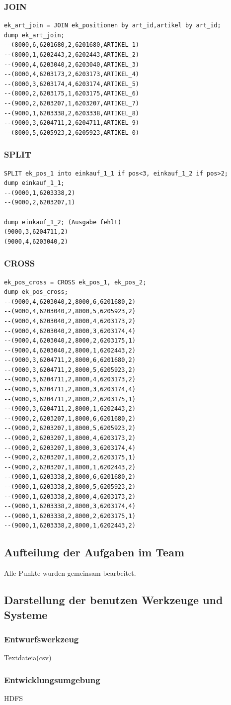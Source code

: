 \begin{itemize}
\subsubsection*{JOIN}
\begin{lstlisting}
ek_art_join = JOIN ek_positionen by art_id,artikel by art_id;
dump ek_art_join;
--(8000,6,6201680,2,6201680,ARTIKEL_1)
--(8000,1,6202443,2,6202443,ARTIKEL_2)
--(9000,4,6203040,2,6203040,ARTIKEL_3)
--(8000,4,6203173,2,6203173,ARTIKEL_4)
--(8000,3,6203174,4,6203174,ARTIKEL_5)
--(8000,2,6203175,1,6203175,ARTIKEL_6)
--(9000,2,6203207,1,6203207,ARTIKEL_7)
--(9000,1,6203338,2,6203338,ARTIKEL_8)
--(9000,3,6204711,2,6204711,ARTIKEL_9)
--(8000,5,6205923,2,6205923,ARTIKEL_0)
\end{lstlisting}

\subsubsection*{SPLIT}
\begin{lstlisting}
SPLIT ek_pos_1 into einkauf_1_1 if pos<3, einkauf_1_2 if pos>2;
dump einkauf_1_1;
--(9000,1,6203338,2)
--(9000,2,6203207,1)

dump einkauf_1_2; (Ausgabe fehlt)
(9000,3,6204711,2)
(9000,4,6203040,2)
\end{lstlisting}

\subsubsection*{CROSS}
\begin{lstlisting}
ek_pos_cross = CROSS ek_pos_1, ek_pos_2;
dump ek_pos_cross;
--(9000,4,6203040,2,8000,6,6201680,2)
--(9000,4,6203040,2,8000,5,6205923,2)
--(9000,4,6203040,2,8000,4,6203173,2)
--(9000,4,6203040,2,8000,3,6203174,4)
--(9000,4,6203040,2,8000,2,6203175,1)
--(9000,4,6203040,2,8000,1,6202443,2)
--(9000,3,6204711,2,8000,6,6201680,2)
--(9000,3,6204711,2,8000,5,6205923,2)
--(9000,3,6204711,2,8000,4,6203173,2)
--(9000,3,6204711,2,8000,3,6203174,4)
--(9000,3,6204711,2,8000,2,6203175,1)
--(9000,3,6204711,2,8000,1,6202443,2)
--(9000,2,6203207,1,8000,6,6201680,2)
--(9000,2,6203207,1,8000,5,6205923,2)
--(9000,2,6203207,1,8000,4,6203173,2)
--(9000,2,6203207,1,8000,3,6203174,4)
--(9000,2,6203207,1,8000,2,6203175,1)
--(9000,2,6203207,1,8000,1,6202443,2)
--(9000,1,6203338,2,8000,6,6201680,2)
--(9000,1,6203338,2,8000,5,6205923,2)
--(9000,1,6203338,2,8000,4,6203173,2)
--(9000,1,6203338,2,8000,3,6203174,4)
--(9000,1,6203338,2,8000,2,6203175,1)
--(9000,1,6203338,2,8000,1,6202443,2)
\end{lstlisting}
\end{itemize}
\subsection*{Aufteilung der Aufgaben im Team}
Alle Punkte wurden gemeinsam bearbeitet.
\subsection*{Darstellung der benutzen Werkzeuge und Systeme}
\subsubsection*{Entwurfswerkzeug}
Textdateia(csv)
\subsubsection*{Entwicklungsumgebung}
HDFS
